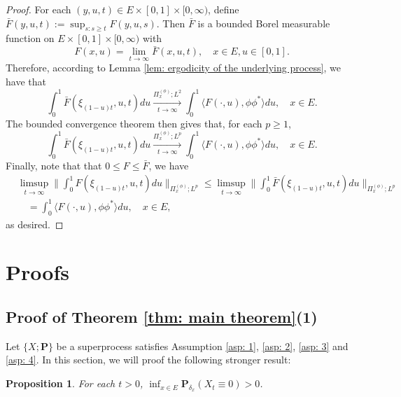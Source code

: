 \documentclass[12pt, a4paper]{amsart}
\newtheorem{prop}[thm]{Proposition}
\theoremstyle{definition}
\numberwithin{equation}{section}
\begin{document}
\begin{proof}
	For each $(y,u,t)\in E\times [0,1]\times [0,\infty)$, define $\bar F(y,u,t) := \sup_{s:s\geq t} F(y,u,s)$.
	Then $\bar F$ is a bounded Borel measurable function on $E\times [0,1]\times [0,\infty)$ with 
\[
	F(x,u)
	= \lim_{t\to \infty} \bar F(x,u,t),
	\quad x\in E, u\in [0,1].
\]
	Therefore, according to Lemma \ref{lem: ergodicity of the underlying process}, we have that
\[
	\int_0^1 \bar F(\xi_{(1-u)t},u,t) du 
	\xrightarrow[t\to \infty]{\Pi_x^{(\phi)};L^2} \int_0^1 \langle F(\cdot , u), \phi\phi^*\rangle du,
	\quad x\in E.
\]
	The bounded convergence theorem then gives that, for each $p \geq 1$, 
\[
	\int_0^1 \bar F(\xi_{(1-u)t},u,t) du 
	\xrightarrow[t\to \infty]{\Pi_x^{(\phi)};L^p} \int_0^1 \langle F(\cdot , u), \phi\phi^*\rangle du,
	\quad x\in E.
\]
	Finally, note that that $0\leq F \leq \bar F$, we have
\[\begin{split}
	& \limsup_{ t \to \infty}  \Big\| \int_0^1 F(\xi_{(1-u) t },u,t) du  \Big\|_{\Pi_x^{(\phi)};L^p}
	\leq 	\limsup_{ t \to \infty}  \Big\| \int_0^1 \bar F(\xi_{(1-u) t },u,t) du  \Big\|_{\Pi_x^{(\phi)};L^p}
	\\& \quad = \int_0^1 \langle F(\cdot, u), \phi \phi^*\rangle du, 
	\quad x\in E,
\end{split}\]
	as desired.
\end{proof}

\section{Proofs}
\subsection{Proof of Theorem \ref{thm: main theorem}(1)}
\label{sec: proof of result 1}
	Let $\{X; \mathbf P\}$ be a superprocess satisfies Assumption \ref{asp: 1}, \ref{asp: 2}, \ref{asp: 3} and \ref{asp: 4}.
	In this section, we will proof the following stronger result:

\begin{prop}
\label{prop: non-presistent}
	For each $t > 0$, $\inf_{x\in E} \mathbf P_{\delta_x}(X_t \equiv 0) > 0$.
\end{prop}
\end{document}
